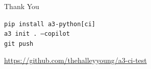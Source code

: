 \documentclass[aspectratio=169]{beamer}
\begin{document}
\begin{frame}
\begin{center}
\Huge Thank You

\bigskip
\large
\texttt{pip install a3-python[ci]} \\
\texttt{a3 init .\ --copilot} \\
\texttt{git push}

\bigskip
\normalsize
\url{https://github.com/thehalleyyoung/a3-ci-test}
\end{center}
\end{frame}
\end{document}
